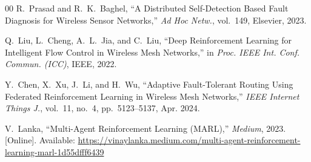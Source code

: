 \documentclass[conference]{IEEEtran}
\begin{document}
\begin{thebibliography}{00}
R.~Prasad and R.~K.~Baghel, ``A Distributed Self-Detection Based Fault Diagnosis for Wireless Sensor Networks,'' \textit{Ad Hoc Netw.}, vol.~149, Elsevier, 2023.

Q.~Liu, L.~Cheng, A.~L.~Jia, and C.~Liu, ``Deep Reinforcement Learning for Intelligent Flow Control in Wireless Mesh Networks,'' in \textit{Proc. IEEE Int. Conf. Commun. (ICC)}, IEEE, 2022.

Y.~Chen, X.~Xu, J.~Li, and H.~Wu, ``Adaptive Fault-Tolerant Routing Using Federated Reinforcement Learning in Wireless Mesh Networks,'' \textit{IEEE Internet Things J.}, vol.~11, no.~4, pp.~5123--5137, Apr. 2024.

V.~Lanka, ``Multi-Agent Reinforcement Learning (MARL),'' \textit{Medium}, 2023. [Online]. Available: \url{https://vinaylanka.medium.com/multi-agent-reinforcement-learning-marl-1d55dfff6439}

\end{thebibliography}
\end{document}

